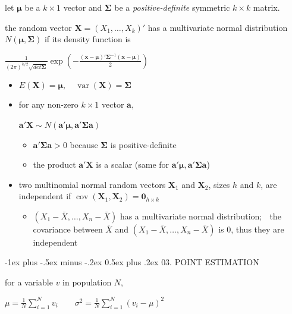 \documentclass[10pt, landscape]{article}
\makeatletter
\renewcommand{\section}{\@startsection{section}{1}{0mm}%
  {-1ex plus -.5ex minus -.2ex}%
  {0.5ex plus .2ex}%
{\normalfont\large\bfseries}}
\newcommand{\cov}{\mathop{\mathrm{cov}}}
\newcommand{\var}{\mathop{\mathrm{var}}}
\newcommand{\Xbar}{\bar{X}}
\newcommand{\seq}[2][n]{#2_1, \dots, #2_{#1}}
\makeatother
\begin{document}
\begin{multicols*}{4}
  let $\bm{\mu}$ be a $k \times 1$ vector and $\bm{\Sigma}$ be a \textit{positive-definite} symmetric $k \times k$ matrix.

  \begin{tightcenter}
    the random vector $\bm{X} = (\seq[k]{X})'$ has a multivariate normal distribution $N(\bm{\mu}, \bm{\Sigma})$ if its density function is 

    \( {\displaystyle{ \frac{1}{(2\pi)^{k/2} \sqrt{det\bm{\Sigma}}} \exp \left(-\frac{(\bm{x} - \bm{\mu})' \bm{\Sigma}^{-1}(\bm{x} - \bm{\mu})}{2}\right) }} \) 
  \end{tightcenter}

  \begin{itemize}
    \item $E(\bm{X}) = \bm{\mu}, \quad \var(\bm{X}) = \bm{\Sigma}$
    \item for any non-zero $k \times 1 $ vector $\bm{a}$, 
      \begin{tightcenter}
        $\bm{a'X} \sim N(\bm{a'\mu}, \bm{a'\Sigma a})$
      \end{tightcenter}
      \begin{itemize}
        \item $\bm{a}'\bm{\Sigma a} > 0$ because $\bm{\Sigma}$ is positive-definite
        \item the product $\bm{a'X}$ is a scalar (same for $\bm{a'\mu}, \bm{a'\Sigma a}$)
      \end{itemize}
    \item two multinomial normal random vectors $\bm{X}_1$ and $\bm{X}_2$, sizes $h$ and $k$, are independent if $\cov (\bm{X}_1, \bm{X}_2) = \bm{0}_{h \times k}$
      \begin{itemize}
        \item $(X_1-\Xbar, \dots, X_n - \Xbar)$ has a multivariate normal distribution; $\;$
          the covariance between $\Xbar$ and $(X_1-\Xbar, \dots, X_n - \Xbar)$ is $0$, thus they are independent
      \end{itemize}
  \end{itemize}

  \section{03. POINT ESTIMATION}

  for a variable $v$ in population $N$, 
  \begin{tightcenter}
    \( {\displaystyle{ 
        \mu = \frac{1}{N} \sum^N_{i=1} v_i
        \quad \quad 
        \sigma^2 = \frac{1}{N} \sum^N_{i=1} (v_i - \mu)^2
    }} \) 
  \end{tightcenter}


\end{multicols*}
\end{document}

